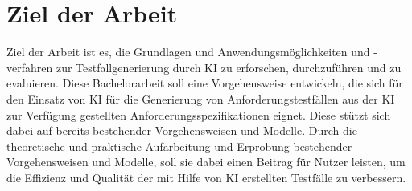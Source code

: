 \documentclass[12pt,toc=bib,toc=listof]{scrreprt}
\begin{document}
\section{Ziel der Arbeit} %
\label{sec:zielDerArbeit}
Ziel der Arbeit ist es, die Grundlagen und Anwendungsmöglichkeiten und -verfahren zur Testfallgenerierung durch KI zu erforschen, durchzuführen und zu evaluieren. Diese Bachelorarbeit soll eine Vorgehensweise entwickeln, die sich für den Einsatz von KI für die Generierung von Anforderungstestfällen aus der KI zur Verfügung gestellten Anforderungsspezifikationen eignet. Diese stützt sich dabei auf bereits bestehender Vorgehensweisen und Modelle. Durch die theoretische und praktische Aufarbeitung und Erprobung bestehender Vorgehensweisen und Modelle, soll sie dabei einen Beitrag für Nutzer leisten, um die Effizienz und Qualität der mit Hilfe von KI erstellten Testfälle zu verbessern.
\end{document}
